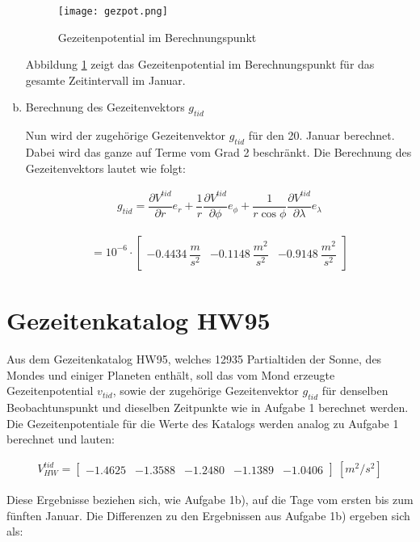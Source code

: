 \begin{enumerate}[a)]
\begin{figure}[H]
\centering
\texttt{[image: gezpot.png]}
\caption{Gezeitenpotential im Berechnungspunkt}
\label{gezpot}
\end{figure}

Abbildung \ref{gezpot} zeigt das Gezeitenpotential im Berechnungspunkt für das gesamte Zeitintervall im Januar. 

\item Berechnung des Gezeitenvektors $g_{tid}$

Nun wird der zugehörige Gezeitenvektor $g_{tid}$ für den 20. Januar berechnet. Dabei wird das ganze auf Terme vom Grad 2 beschränkt. Die Berechnung des Gezeitenvektors lautet wie folgt: 

\begin{gather}
g_{tid} = \dfrac{\partial V^{tid}}{\partial r} e_r + \dfrac{1}{r} \dfrac{\partial V^{tid}}{\partial \phi} e_{\phi} + \dfrac{1}{r \cos \phi} \dfrac{\partial V^{tid}}{\partial \lambda} e_{\lambda}
\end{gather}

\begin{gather*}
= 10^{-6} \cdot \begin{bmatrix}
-0.4434 ~\dfrac{m}{s^2} &-0.1148 ~\dfrac{m^2}{s^2} &-0.9148 ~\dfrac{m^2}{s^2}
\end{bmatrix}
\end{gather*}
\end{enumerate}

\section{Gezeitenkatalog HW95}

Aus dem Gezeitenkatalog HW95, welches 12935 Partialtiden der Sonne, des Mondes und einiger Planeten enthält, soll das vom Mond erzeugte Gezeitenpotential $v_{tid}$, sowie der zugehörige Gezeitenvektor $g_{tid}$ für denselben Beobachtunspunkt und dieselben Zeitpunkte wie in Aufgabe 1 berechnet werden. Die Gezeitenpotentiale für die Werte des Katalogs werden analog zu Aufgabe 1 berechnet und lauten: 

\begin{gather}
V_{HW}^{tid} = \begin{bmatrix}
-1.4625 &-1.3588& -1.2480&-1.1389&-1.0406
\end{bmatrix}~[m^2/s^2]
\end{gather}

Diese Ergebnisse beziehen sich, wie Aufgabe 1b), auf die Tage vom ersten bis zum fünften Januar. Die Differenzen zu den Ergebnissen aus Aufgabe 1b) ergeben sich als: 

